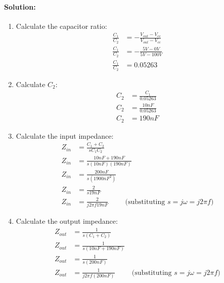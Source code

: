 \paragraph{Solution:}
\begin{enumerate}
  \item Calculate the capacitor ratio:
    \begin{align*}
      \frac{C_1}{C_2} &= -\frac{V_{out} - V_{ee}}{V_{out} - V_{cc}} \\
      \frac{C_1}{C_2} &= -\frac{5V - 0V}{5V - 100V} \\
      \frac{C_1}{C_2} &= 0.05263
    \end{align*}
  \item Calculate \(C_2\):
    \begin{align*}
      C_2 &= \frac{C_1}{0.05263} \\
      C_2 &= \frac{10nF}{0.05263} \\
      C_2 &= 190nF
    \end{align*}
  \item Calculate the input impedance:
    \begin{align*}
      Z_{in} &= \frac{C_1 + C_2}{s C_1 C_2} \\
      Z_{in} &= \frac{10nF + 190nF}{s (10nF)(190nF)} \\
      Z_{in} &= \frac{200nF}{s (1900nF^2)} \\
      Z_{in} &= \frac{2}{s 19nF} \\
      Z_{in} &= \frac{2}{j 2 \pi f 19nF} \hspace{1cm} \text{(substituting \(s = j \omega = j 2 \pi f\))}
    \end{align*}
  \item Calculate the output impedance:
    \begin{align*}
      Z_{out} &= \frac{1}{s(C_1 + C_2)} \\
      Z_{out} &= \frac{1}{s(10nF + 190nF)} \\
      Z_{out} &= \frac{1}{s(200nF)} \\
      Z_{out} &= \frac{1}{j 2 \pi f (200nF)} \hspace{1cm} \text{(substituting \(s = j \omega = j 2 \pi f\))}
    \end{align*}
\end{enumerate}

